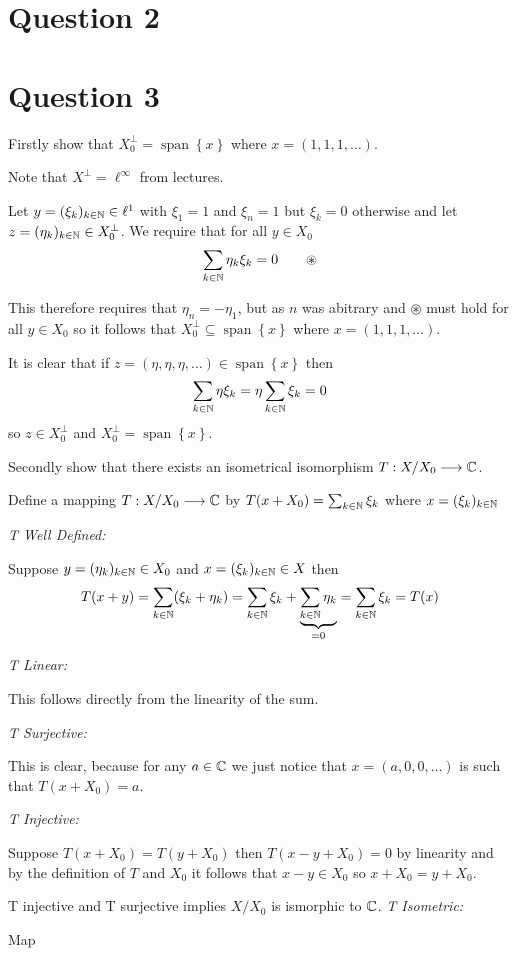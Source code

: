 \documentclass{unswmaths}
\begin{document}
\section*{Question 2}

\section*{Question 3}

Firstly show that $ X_0^\perp = \operatorname{span}\left\{ x \right\} $ where $ x = (1,1,1, \ldots ) $.

Note that $ X^\perp = \ell^\infty $ from lectures. 

Let $ y = (\xi_k)_{k\in\mathbb{N}} \in \ell^1 $ with $ \xi_1 = 1 $ and $ \xi_n = 1 $ but $ \xi_k = 0 $ otherwise and let $ z = ( \eta_k )_{k \in \mathbb{N}} \in X_0^\perp $. We require that for all $ y \in X_0 $
$$
	\sum_{k \in \Ntrl} \eta_k \xi_k = 0 \ \ \ \ \ \ \circledast
$$

This therefore requires that $ \eta_n = -\eta_1 $, but as $ n $ was abitrary and $\circledast $ must hold for all $ y \in X_0 $ so it follows that $ X_0^\perp \subseteq \operatorname{span}\left\{ x\right\}$ where $ x = (1,1,1,\ldots) $.

It is clear that if $ z = (\eta, \eta, \eta, \ldots) \in \operatorname{span}\left\{ x \right\} $ then 
$$
	\sum_{k \in \mathbb{N}} \eta \xi_k = \eta \sum_{k \in \mathbb{N}} \xi_k = 0
$$
so $ z \in X_0^\perp $ and $ X_0^\perp = \operatorname{span}\left\{ x \right\} $.

Secondly show that there exists an isometrical isomorphism $ T : X/X_0 \longrightarrow \mathbb{C} $.

Define a mapping $ T : X/X_0 \longrightarrow \mathbb{C} $ by $ T(x + X_0) = \sum_{k \in \mathbb{N}}\xi_k $ where $ x = (\xi_k)_{k \in \mathbb{N}} $

\emph{T Well Defined: }

Suppose $ y = (\eta_k)_{k \in \mathbb{N}} \in X_0 $ and $ x = (\xi_k)_{k \in \mathbb{N}} \in X $ then 
$$ T(x +y) =  \sum_{k \in \mathbb{N}} (\xi_k + \eta_k) = \sum_{k \in \mathbb{N}} \xi_k + \underbrace{\sum_{k \in \mathbb{N}} \eta_k}_{=0} = \sum_{k \in \mathbb{N}} \xi_k = T(x) $$

\emph{T Linear: }

This follows directly from the linearity of the sum.

\emph{T Surjective: }

This is clear, because for any $ a \in \mathbb{C} $ we just notice that $ x = (a, 0, 0, \ldots ) $ is such that $ T(x + X_0) = a $.

\emph{T Injective: }

Suppose $ T(x + X_0) = T(y + X_0) $ then $ T(x -y  + X_0) = 0 $ by linearity and by the definition of $ T $ and $ X_0 $ it follows that $ x - y \in X_0 $ so $ x + X_0 = y + X_0 $.


T injective and T surjective implies $ X/X_0 $ is ismorphic to $ \mathbb{C} $.
\emph{T Isometric: }

Map 
\end{document}
